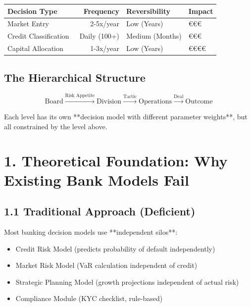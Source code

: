 \documentclass[11pt]{article}
\begin{document}
\begin{table}[h]
\centering
\begin{tabular}{|l|r|l|l|}
\hline
\textbf{Decision Type} & \textbf{Frequency} & \textbf{Reversibility} & \textbf{Impact} \\
\hline
Market Entry & 2-5x/year & Low (Years) & €€€ \\
Credit Classification & ~Daily (100+) & Medium (Months) & €€€ \\
Capital Allocation & 1-3x/year & Low (Years) & €€€€ \\
\hline
\end{tabular}
\end{table}

\subsection{The Hierarchical Structure}

\begin{equation}
\text{Board} \xrightarrow{\text{Risk Appetite}} \text{Division} \xrightarrow{\text{Tactic}} \text{Operations} \xrightarrow{\text{Deal}} \text{Outcome}
\end{equation}

Each level has its own **decision model with different parameter weights**, but all constrained by the level above.

\section{1. Theoretical Foundation: Why Existing Bank Models Fail}

\subsection{1.1 Traditional Approach (Deficient)}

Most banking decision models use **independent silos**:
\begin{itemize}
\item Credit Risk Model (predicts probability of default independently)
\item Market Risk Model (VaR calculation independent of credit)
\item Strategic Planning Model (growth projections independent of actual risk)
\item Compliance Module (KYC checklist, rule-based)
\end{itemize}
\end{document}
